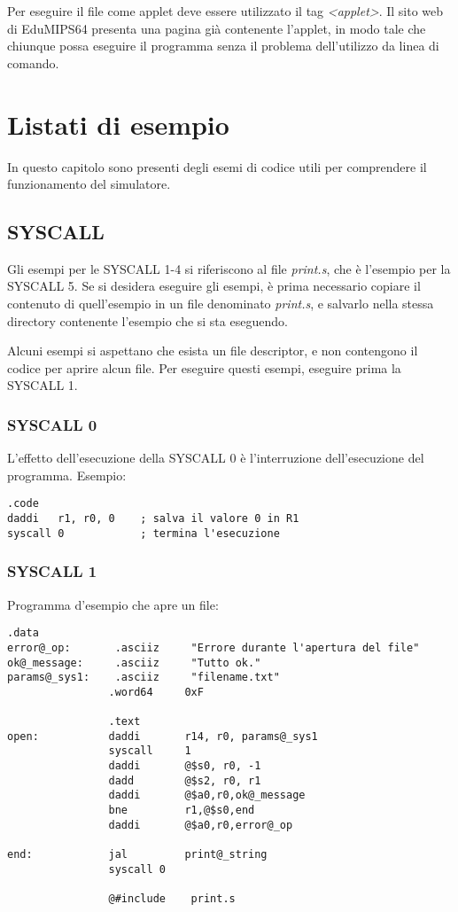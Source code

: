 \documentclass[letterpaper,10pt,italian]{sphinxmanual}
\begin{document}
Per eseguire il file come applet deve essere utilizzato il tag
\emph{\textless{}applet\textgreater{}}. Il sito web di EduMIPS64 presenta una pagina già contenente
l'applet, in modo tale che chiunque possa eseguire il programma senza il
problema dell'utilizzo da linea di comando.


\chapter{Listati di esempio}
\label{examples::doc}\label{examples:listati-di-esempio}
In questo capitolo sono presenti degli esemi di codice utili per comprendere
il funzionamento del simulatore.


\section{SYSCALL}
\label{examples:syscall}
Gli esempi per le SYSCALL 1-4 si riferiscono al file \emph{print.s}, che è
l'esempio per la SYSCALL 5. Se si desidera eseguire gli esempi, è prima
necessario copiare il contenuto di quell'esempio in un file denominato
\emph{print.s}, e salvarlo nella stessa directory contenente l'esempio che si sta
eseguendo.

Alcuni esempi si aspettano che esista un file descriptor, e non contengono il
codice per aprire alcun file. Per eseguire questi esempi, eseguire prima la
SYSCALL 1.


\subsection{SYSCALL 0}
\label{examples:syscall-0}
L'effetto dell'esecuzione della SYSCALL 0 è l'interruzione dell'esecuzione del programma.
Esempio:

\begin{Verbatim}[commandchars=@\[\]]
.code
daddi   r1, r0, 0    ; salva il valore 0 in R1
syscall 0            ; termina l'esecuzione
\end{Verbatim}


\subsection{SYSCALL 1}
\label{examples:syscall-1}
Programma d'esempio che apre un file:

\begin{Verbatim}[commandchars=@\[\]]
                .data
error@_op:       .asciiz     "Errore durante l'apertura del file"
ok@_message:     .asciiz     "Tutto ok."
params@_sys1:    .asciiz     "filename.txt"
                .word64     0xF

                .text
open:           daddi       r14, r0, params@_sys1
                syscall     1
                daddi       @$s0, r0, -1
                dadd        @$s2, r0, r1
                daddi       @$a0,r0,ok@_message
                bne         r1,@$s0,end
                daddi       @$a0,r0,error@_op

end:            jal         print@_string
                syscall 0

                @#include    print.s
\end{Verbatim}
\end{document}

